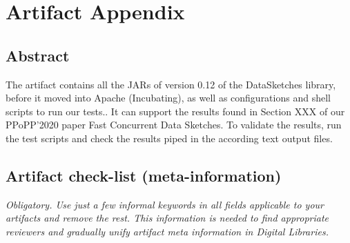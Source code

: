 \documentclass{sigplanconf}
\begin{document}


\appendix
\section{Artifact Appendix}

\subsection{Abstract}

The artifact contains all the JARs of version 0.12 of the DataSketches
library, before it moved into Apache (Incubating), as well as configurations
and shell scripts to run our tests.. It can support the results found in
Section XXX of our PPoPP'2020 paper Fast Concurrent Data Sketches. To
validate the results, run the test scripts and check the results piped
in the according text output files.

\subsection{Artifact check-list (meta-information)}

{\em Obligatory. Use just a few informal keywords in all fields applicable to your artifacts
and remove the rest. This information is needed to find appropriate reviewers and gradually 
unify artifact meta information in Digital Libraries.}
\end{document}

